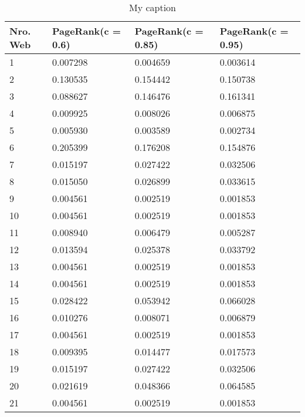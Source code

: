 \begin{table}[H]
\centering
\caption{My caption}
\label{my-label}
\begin{tabular}{llll}
\hline
Nro. Web & PageRank(c = 0.6) & PageRank(c = 0.85) & PageRank(c = 0.95) \\ \hline
1        & 0.007298          & 0.004659           & 0.003614           \\
2        & 0.130535          & 0.154442           & 0.150738           \\
3        & 0.088627          & 0.146476           & 0.161341           \\
4        & 0.009925          & 0.008026           & 0.006875           \\
5        & 0.005930          & 0.003589           & 0.002734           \\
6        & 0.205399          & 0.176208           & 0.154876           \\
7        & 0.015197          & 0.027422           & 0.032506           \\
8        & 0.015050          & 0.026899           & 0.033615           \\
9        & 0.004561          & 0.002519           & 0.001853           \\
10       & 0.004561          & 0.002519           & 0.001853           \\
11       & 0.008940          & 0.006479           & 0.005287           \\
12       & 0.013594          & 0.025378           & 0.033792           \\
13       & 0.004561          & 0.002519           & 0.001853           \\
14       & 0.004561          & 0.002519           & 0.001853           \\
15       & 0.028422          & 0.053942           & 0.066028           \\
16       & 0.010276          & 0.008071           & 0.006879           \\
17       & 0.004561          & 0.002519           & 0.001853           \\
18       & 0.009395          & 0.014477           & 0.017573           \\
19       & 0.015197          & 0.027422           & 0.032506           \\
20       & 0.021619          & 0.048366           & 0.064585           \\
21       & 0.004561          & 0.002519           & 0.001853           \\

\end{tabular}
\end{table}
